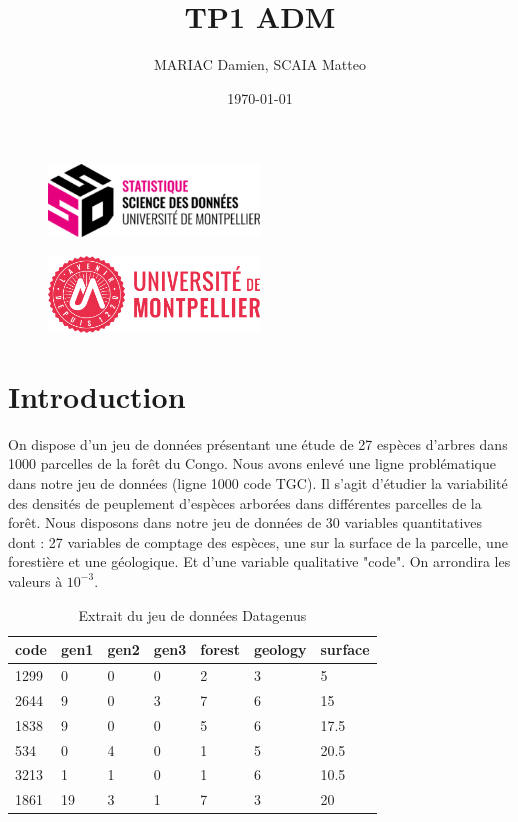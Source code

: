 \documentclass{article}
\title{TP1 ADM}
\author{MARIAC Damien, SCAIA Matteo}
\date{\today}
\begin{document}
\maketitle

\begin{figure}[h] 
    \centering
    \includegraphics[width=0.5\textwidth]{ssd_logo.png} 
\end{figure}

\begin{figure}[h] 
    \centering
    \includegraphics[width=0.5\textwidth]{logo_um_2022_rouge_RVB.png} 
\end{figure}

\newpage

\tableofcontents

\newpage

\section{Introduction}
On dispose d'un jeu de données présentant une étude de 27 espèces d'arbres dans 1000 parcelles de la forêt du Congo.
 Nous avons enlevé une ligne problématique dans notre jeu de données (ligne 1000 code TGC). Il s'agit d'étudier la variabilité des densités de peuplement d'espèces arborées dans différentes parcelles de la forêt.
 Nous disposons dans notre jeu de données de 30 variables quantitatives dont : 27 variables de comptage des espèces, une sur la surface de la parcelle, une forestière et une géologique. Et d'une variable qualitative "code".
  On arrondira les valeurs à $10^{-3}$.


\begin{table}[H]
    \centering
    \begin{tabular}{|l|l|l|l|l|l|l|}
    \hline
    code & gen1 & gen2 & gen3 & forest & geology & surface \\ \hline
    1299 & 0    & 0    & 0    & 2      & 3       & 5       \\ \hline
    2644 & 9    & 0    & 3    & 7      & 6       & 15      \\ \hline
    1838 & 9    & 0    & 0    & 5      & 6       & 17.5    \\ \hline
    534  & 0    & 4    & 0    & 1      & 5       & 20.5    \\ \hline
    3213 & 1    & 1    & 0    & 1      & 6       & 10.5    \\ \hline
    1861 & 19   & 3    & 1    & 7      & 3       & 20      \\ \hline
    \end{tabular}
    \caption{Extrait du jeu de données Datagenus}
\end{table}
\end{document}
